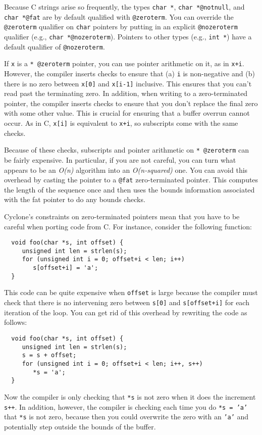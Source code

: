 Because C strings arise so frequently, the types \texttt{char *},
\texttt{char *@notnull}, and \texttt{char *@fat} are by default
qualified with \texttt{@zeroterm}.  You can override the
\texttt{@zeroterm} qualifier on \texttt{char} pointers by putting in
an explicit \texttt{@nozeroterm} qualifier (e.g., \texttt{char
*@nozeroterm}).  Pointers to other types (e.g., \texttt{int *})
have a default qualifier of \texttt{@nozeroterm}.

If \texttt{x} is a \texttt{* @zeroterm} pointer, you can use pointer
arithmetic on it, as in \texttt{x+i}.  However, the compiler inserts
checks to ensure that (a) \texttt{i} is non-negative and (b) there is
no zero between \texttt{x[0]} and \texttt{x[i-1]} inclusive.  This
ensures that you can't read past the terminating zero.  In addition,
when writing to a zero-terminated pointer, the compiler inserts checks
to ensure that you don't replace the final zero with some other value.
This is crucial for ensuring that a buffer overrun cannot occur.
As in C, \texttt{x[i]} is equivalent to \texttt{x+i}, so subscripts
come with the same checks.

Because of these checks, subscripts and pointer arithmetic on
\texttt{* @zeroterm} can be fairly expensive.  In particular, if you
are not careful, you can turn what appears to be an \emph{O(n)}
algorithm into an \emph{O(n-squared)} one.  You can avoid this
overhead by casting the pointer to a \texttt{@fat} zero-terminated
pointer.  This computes the length of the sequence once and then uses
the bounds information associated with the fat pointer to do any
bounds checks.

Cyclone's constraints on zero-terminated pointers mean that you have
to be careful when porting code from C\@.  For instance, consider the
following function:
\begin{verbatim}
  void foo(char *s, int offset) {
     unsigned int len = strlen(s);
     for (unsigned int i = 0; offset+i < len; i++)
        s[offset+i] = 'a';
  }
\end{verbatim}
This code can be quite expensive when \texttt{offset} is large
because the compiler must check that there is no intervening
zero between \texttt{s[0]} and \texttt{s[offset+i]} for each
iteration of the loop.  You can get rid of this overhead by
rewriting the code as follows:
\begin{verbatim}
  void foo(char *s, int offset) {
     unsigned int len = strlen(s);
     s = s + offset;
     for (unsigned int i = 0; offset+i < len; i++, s++)
        *s = 'a';
  }
\end{verbatim}
Now the compiler is only checking that \texttt{*s} is not
zero when it does the increment \texttt{s++}.  In addition,
however, the compiler is checking each time you do \texttt{*s = 'a'}
that \texttt{*s} is not zero, because then you could overwrite
the zero with an \texttt{'a'} and potentially step outside
the bounds of the buffer. 

